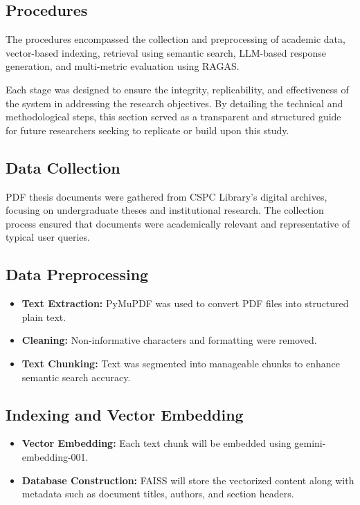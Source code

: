 \begin{refsection}
\section{Procedures}

The procedures encompassed the collection and preprocessing of academic data, vector-based indexing, retrieval using semantic search, LLM-based response generation, and multi-metric evaluation using RAGAS.

Each stage was designed to ensure the integrity, replicability, and effectiveness of the system in addressing the research objectives. By detailing the technical and methodological steps, this section served as a transparent and structured guide for future researchers seeking to replicate or build upon this study.

\subsection*{Data Collection}

PDF thesis documents were gathered from CSPC Library’s digital archives, focusing on undergraduate theses and institutional research. The collection process ensured that documents were academically relevant and representative of typical user queries.

\subsection{Data Preprocessing}

\begin{itemize}
    \item \textbf{Text Extraction:} PyMuPDF was used to convert PDF files into structured plain text.
    \item \textbf{Cleaning:} Non-informative characters and formatting were removed.
    \item \textbf{Text Chunking:} Text was segmented into manageable chunks to enhance semantic search accuracy.
\end{itemize}

\subsection*{Indexing and Vector Embedding}

\begin{itemize}
    \item \textbf{Vector Embedding:} Each text chunk will be embedded using gemini-embedding-001.
    \item \textbf{Database Construction:} FAISS will store the vectorized content along with metadata such as document titles, authors, and section headers.
\end{itemize}


\end{refsection}
